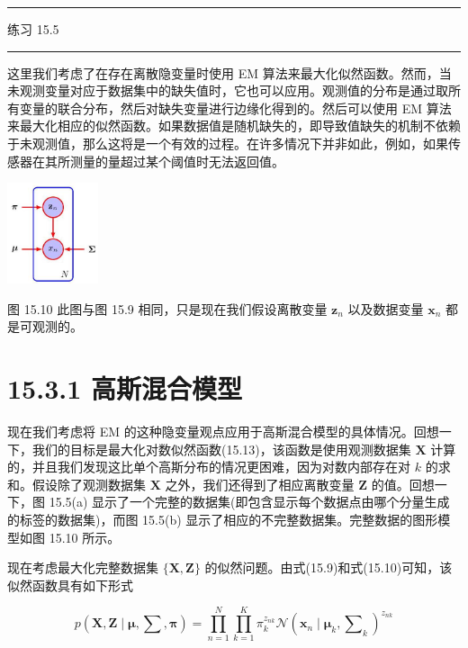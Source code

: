 \documentclass[10pt]{report}
\newcommand{\HRule}{\begin{center}\rule{0.9\linewidth}{0.2mm}\end{center}}
\begin{document}
\HRule

练习 15.5

\HRule

这里我们考虑了在存在离散隐变量时使用 EM 算法来最大化似然函数。然而，当未观测变量对应于数据集中的缺失值时，它也可以应用。观测值的分布是通过取所有变量的联合分布，然后对缺失变量进行边缘化得到的。然后可以使用 EM 算法来最大化相应的似然函数。如果数据值是随机缺失的，即导致值缺失的机制不依赖于未观测值，那么这将是一个有效的过程。在许多情况下并非如此，例如，如果传感器在其所测量的量超过某个阈值时无法返回值。

\begin{center}
\includegraphics[max width=0.2\textwidth]{images/0194e279-9b28-703a-88f4-c3ac21e2010d_497_1219_344_281_312_0.jpg}
\end{center}
\hspace*{3em} 

图 15.10 此图与图 15.9 相同，只是现在我们假设离散变量 \({\mathbf{z}}_{n}\) 以及数据变量 \({\mathbf{x}}_{n}\) 都是可观测的。

\section*{15.3.1 高斯混合模型}

现在我们考虑将 EM 的这种隐变量观点应用于高斯混合模型的具体情况。回想一下，我们的目标是最大化对数似然函数(15.13)，该函数是使用观测数据集 \(\mathbf{X}\) 计算的，并且我们发现这比单个高斯分布的情况更困难，因为对数内部存在对 \(k\) 的求和。假设除了观测数据集 \(\mathbf{X}\) 之外，我们还得到了相应离散变量 \(\mathbf{Z}\) 的值。回想一下，图 15.5(a) 显示了一个完整的数据集(即包含显示每个数据点由哪个分量生成的标签的数据集)，而图 15.5(b) 显示了相应的不完整数据集。完整数据的图形模型如图 15.10 所示。

现在考虑最大化完整数据集 \(\{ \mathbf{X},\mathbf{Z}\}\) 的似然问题。由式(15.9)和式(15.10)可知，该似然函数具有如下形式

\[
p\left( {\mathbf{X},\mathbf{Z} \mid  \mathbf{\mu },\mathbf{\sum },\mathbf{\pi }}\right)  = \mathop{\prod }\limits_{{n = 1}}^{N}\mathop{\prod }\limits_{{k = 1}}^{K}{\pi }_{k}^{{z}_{nk}}\mathcal{N}{\left( {\mathbf{x}}_{n} \mid  {\mathbf{\mu }}_{k},{\mathbf{\sum }}_{k}\right) }^{{z}_{nk}} \tag{15.25}
\]
\end{document}
